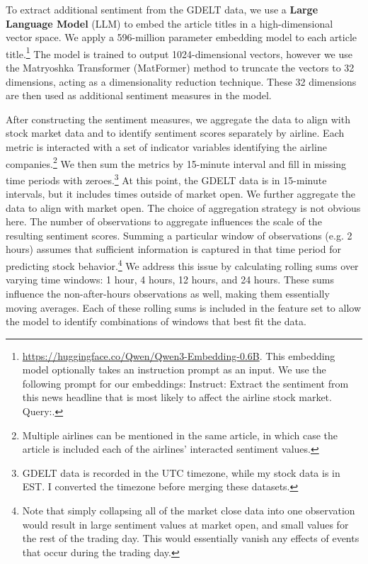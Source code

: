 \documentclass[12pt]{article}
\begin{document}
To extract additional sentiment from the GDELT data, we use a \textbf{Large Language Model} (LLM) to embed the article titles in a high-dimensional vector space. We apply a 596-million parameter embedding model to each article title.\footnote{\url{https://huggingface.co/Qwen/Qwen3-Embedding-0.6B}. This embedding model optionally takes an instruction prompt as an input. We use the following prompt for our embeddings: \textsf{Instruct: Extract the sentiment from this news headline that is most likely to affect the airline stock market. Query:}.} The model is trained to output 1024-dimensional vectors, however we use the Matryoshka Transformer (MatFormer) method to truncate the vectors to 32 dimensions, acting as a dimensionality reduction technique. These 32 dimensions are then used as additional sentiment measures in the model.

After constructing the sentiment measures, we aggregate the data to align with stock market data and to identify sentiment scores separately by airline. Each metric is interacted with a set of indicator variables identifying the airline companies.\footnote{Multiple airlines can be mentioned in the same article, in which case the article is included each of the airlines' interacted sentiment values.} We then sum the metrics by 15-minute interval and fill in missing time periods with zeroes.\footnote{GDELT data is recorded in the UTC timezone, while my stock data is in EST. I converted the timezone before merging these datasets.} At this point, the GDELT data is in 15-minute intervals, but it includes times outside of market open. We further aggregate the data to align with market open. The choice of aggregation strategy is not obvious here. The number of observations to aggregate influences the scale of the resulting sentiment scores. Summing a particular window of observations (e.g. 2 hours) assumes that sufficient information is captured in that time period for predicting stock behavior.\footnote{Note that simply collapsing all of the market close data into one observation would result in large sentiment values at market open, and small values for the rest of the trading day. This would essentially vanish any effects of events that occur during the trading day.} We address this issue by calculating rolling sums over varying time windows: 1 hour, 4 hours, 12 hours, and 24 hours. These sums influence the non-after-hours observations as well, making them essentially moving averages. Each of these rolling sums is included in the feature set to allow the model to identify combinations of windows that best fit the data.
\end{document}
